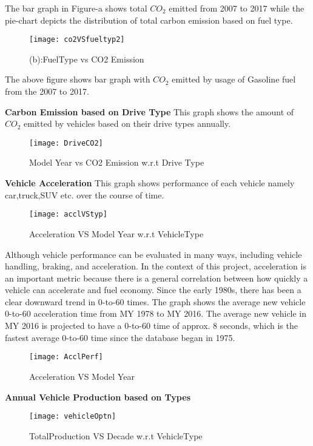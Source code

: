 \documentclass{acm_proc_article-sp}
\begin{document}
The bar graph in Figure-a shows total $CO_{2}$ emitted from 2007 to 2017 while the pie-chart depicts the distribution of total carbon emission based on fuel type.

\begin{figure}[H]
\centering
\texttt{[image: co2VSfueltyp2]}
\caption{(b):FuelType vs CO2 Emission}
\end{figure}

The above figure shows bar graph with $CO_{2}$ emitted by usage of Gasoline fuel from the 2007 to 2017. 

\textbf{Carbon Emission based on Drive Type}
This graph shows the amount of $CO_{2}$ emitted by vehicles based on their drive types annually. 

\begin{figure}[H]
\centering
\texttt{[image: DriveCO2]}
\caption{Model Year vs CO2 Emission w.r.t Drive Type}
\end{figure}

\textbf{Vehicle Acceleration}
This graph shows performance of each vehicle namely car,truck,SUV etc. over the course of time.

\begin{figure}[H]
\centering
\texttt{[image: acclVStyp]}
\caption{Acceleration VS Model Year w.r.t VehicleType}
\end{figure}

Although vehicle performance can be evaluated in many ways, including vehicle handling, braking, and acceleration. In the context of this project, acceleration is an important metric because there is a general correlation between how quickly a vehicle can accelerate and fuel economy. Since the early 1980s, there has been a clear downward trend in 0-to-60 times. The graph shows the average new vehicle 0-to-60 acceleration time from MY 1978 to MY 2016. The average new vehicle in MY 2016 is projected to have a 0-to-60 time of approx. 8 seconds, which is the fastest average 0-to-60 time since the database began in 1975. 

\begin{figure}[H]
\centering
\texttt{[image: AcclPerf]}
\caption{Acceleration VS Model Year}
\end{figure}

\textbf{Annual Vehicle Production based on Types}
\begin{figure}[H]
\centering
\texttt{[image: vehicleOptn]}
\caption{TotalProduction VS Decade w.r.t VehicleType}
\end{figure}
\end{document}
